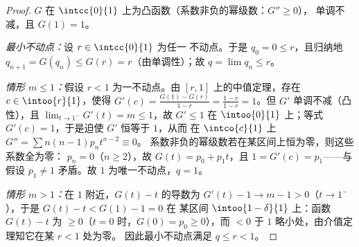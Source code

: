 \begin{proof}
$G$ 在 $\intcc{0}{1}$ 上为凸函数（系数非负的幂级数：$G'' \geq 0$），
单调不减，且 $G(1) = 1$。

\emph{最小不动点：}设 $r \in \intcc{0}{1}$ 为任一
不动点。于是 $q_0 = 0 \leq r$，且归纳地 $q_{n+1} = G(q_n)
\leq G(r) = r$（由单调性）；故 $q = \lim q_n \leq r$。

\emph{情形 $m \leq 1$：}假设 $r < 1$ 为一不动点。由
$[r, 1]$ 上的中值定理，存在 $c \in \intoo{r}{1}$，使得
$G'(c) = \frac{G(1) - G(r)}{1 - r} = \frac{1 - r}{1 - r} = 1$。但
$G'$ 单调不减（凸性），且 $\lim_{t\to1^-}G'(t) = m
\leq 1$，故 $G' \leq 1$ 在 $\intoo{0}{1}$ 上；等式 $G'(c) =
1$，于是迫使 $G'$ 恒等于 $1$，从而
在 $\intco{c}{1}$ 上 $G'' = \sum n(n-1)p_nt^{n-2} \equiv 0$。
系数非负的幂级数若在某区间上恒为零，则这些系数全为零：
$p_n = 0$（$n \geq 2$），故 $G(t) = p_0
+ p_1t$，且 $1 = G'(c) = p_1$——与假设
$p_1 \neq 1$ 矛盾。故 $1$ 为唯一不动点，$q = 1$。

\emph{情形 $m > 1$：}在 $1$ 附近，$G(t) - t$ 的导数为 $G'(t) -
1 \to m - 1 > 0$（$t \to 1^-$），于是 $G(t) - t < G(1) - 1 = 0$ 在
某区间 $\intoo{1 - \delta}{1}$ 上：函数
$G(t) - t$ 为 $\geq 0$（$t = 0$ 时，$G(0) = p_0 \geq 0$），而 $< 0$
于 $1$ 略小处，由介值定理知它在某 $r < 1$ 处为零。
因此最小不动点满足 $q \leq r < 1$。
\end{proof}

